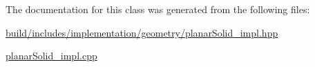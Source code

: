 The documentation for this class was generated from the following files\+:\begin{DoxyCompactItemize}
\item 
\hyperlink{build_2includes_2implementation_2geometry_2planarSolid__impl_8hpp}{build/includes/implementation/geometry/planar\+Solid\+\_\+impl.\+hpp}\item 
\hyperlink{planarSolid__impl_8cpp}{planar\+Solid\+\_\+impl.\+cpp}\end{DoxyCompactItemize}
